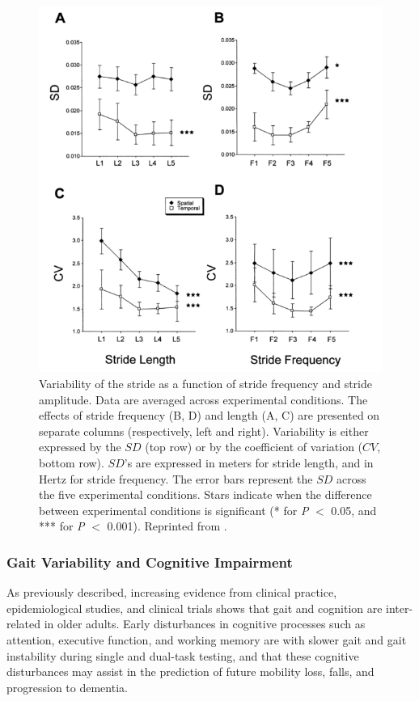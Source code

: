 \documentclass[11pt, oneside]{report}   	%
\begin{document}
\begin{figure}[H]
  \centering
    \includegraphics[scale=0.7]{temp_spat_variability}
  \caption{Variability of the stride as a function of stride frequency and stride amplitude. Data are averaged across experimental conditions. The effects of stride frequency (B, D) and length (A, C) are presented on separate columns (respectively, left and right). Variability is either expressed by the $SD$ (top row) or by the coefficient of variation ($CV$, bottom row). $SD$'s are expressed in meters for stride length, and in Hertz for stride frequency. The error bars represent the $SD$ across the five experimental conditions. Stars indicate when the difference between experimental conditions is significant (* for \textit{P} $<$ 0.05, and *** for \textit{P} $<$ 0.001). Reprinted from \cite{Danion2003}.}
  \label{fig:temp_spat_variability}
\end{figure}

\subsubsection{Gait Variability and Cognitive Impairment}

As previously described, increasing evidence from clinical practice, epidemiological studies, and clinical trials shows that gait and cognition are inter-related in older adults\cite{Montero-Odasso2013}. Early disturbances in cognitive processes such as attention, executive function, and working memory are with slower gait and gait instability during single and dual-task testing, and that these cognitive disturbances may assist in the prediction of future mobility loss, falls, and progression to dementia\cite{Montero-Odasso2013}. 
\end{document}
